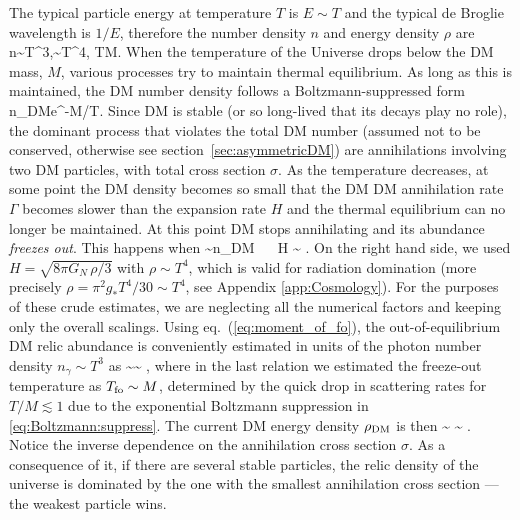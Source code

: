 The typical particle energy at temperature $T$ is $E\sim T$ and the typical de Broglie wavelength is $1/E$, therefore the
number density $n$ and energy density $\rho$ are
\beq n\sim T^3,\qquad \rho\sim T^4, \quad T\gg M.\eeq
When the temperature of the Universe drops below the DM mass, $M$, 
various processes try to maintain thermal equilibrium. As long as this is maintained, the DM number density follows a Boltzmann-suppressed form
\beq 
\label{eq:Boltzmann:suppress}
n_{\rm DM}\propto e^{-M/T}.
\eeq
Since DM is stable (or so long-lived that its decays play no role), the dominant process that violates the total DM number (assumed not to be conserved, otherwise see section~\ref{sec:asymmetricDM})
are annihilations involving two DM particles, with total cross section $\sigma$.
As the temperature decreases, at some point the DM density becomes so small that the DM DM annihilation rate $\Gamma$ becomes slower than the expansion rate $H$ 
and the thermal equilibrium can no longer be maintained. At this point DM stops annihilating and its abundance {\em freezes out}. This happens when
\beq 
\label{eq:moment_of_fo}
\Gamma \sim \langle n_{\rm DM} \sigma \rangle~ \circa{<} ~H \sim  
{}.
\eeq
On the right hand side, we used $H=\sqrt{8 \pi G_N \, \rho/3}$  with $\rho  \sim T^4$, which is valid for radiation domination
(more precisely $\rho  = \pi^2 g_* T^4/30 \sim T^4$, see Appendix \ref{app:Cosmology}).
For the purposes of these crude estimates, we are neglecting all the numerical factors and keeping only the overall scalings.
Using eq.~(\ref{eq:moment_of_fo}), the out-of-equilibrium DM relic abundance is conveniently estimated in units of the photon number density $n_\gamma \sim T^3$ as
\beq \label{eq:nDMestimate}
 \sim {}\sim
 ,
\eeq
where in the last relation we estimated the freeze-out temperature as $T_{\rm fo} \sim M$, determined by the quick drop in scattering rates for $T/M\lesssim 1$ due to the exponential Boltzmann suppression in \eqref{eq:Boltzmann:suppress}.
The current DM energy density $\rho_{\rm DM}$ is then 
\beq 
{}\sim {}
 \sim {}  .\label{eq:rhoDMestimate}\eeq
Notice the inverse dependence on the annihilation cross section $\sigma$. As a consequence of it, if there are several stable particles,
the relic density of the universe is dominated by the one with the smallest annihilation cross section ---
the weakest particle wins.

